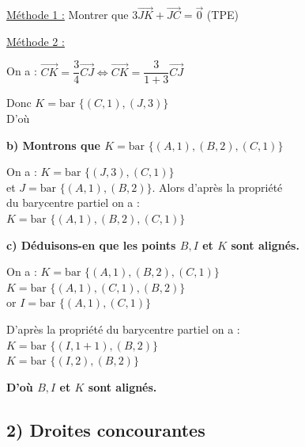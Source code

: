\documentclass{article}
\begin{document}
\noindent \underline{Méthode 1 :} Montrer que $3 \overrightarrow{JK} + \overrightarrow{JC} = \vec{0}$ (TPE)

\noindent \underline{Méthode 2 :}

\noindent On a : $\overrightarrow{CK} = \dfrac{3}{4} \overrightarrow{CJ} \iff \overrightarrow{CK} = \dfrac{3}{1 + 3} \overrightarrow{CJ}$

\vspace{1.5em}

\noindent Donc $K = \text{bar } \{(C, 1), (J, 3)\}$ \\
D'où 

\vspace{2em}

\noindent \textbf{b) Montrons que $K = \text{bar } \{(A, 1), (B, 2), (C, 1)\}$}

\noindent On a : $K = \text{bar } \{(J, 3), (C, 1)\}$ \\
\phantom{On a : } et $J = \text{bar } \{(A, 1), (B, 2)\}$. Alors d'après la propriété \\
du barycentre partiel on a : \\
$K = \text{bar } \{(A, 1), (B, 2), (C, 1)\}$

\vspace{2em}

\noindent \textbf{c) Déduisons-en que les points $B, I$ et $K$ sont alignés.}

\vspace{1em}

\noindent On a : $K = \text{bar } \{(A, 1), (B, 2), (C, 1)\}$ \\
\phantom{On a : } $K = \text{bar } \{(A, 1), (C, 1), (B, 2)\}$ \\
\phantom{On a : } or $I = \text{bar } \{(A, 1), (C, 1)\}$

\vspace{1em}

\noindent D'après la propriété du barycentre partiel on a : \\
$K = \text{bar } \{(I, 1 + 1), (B, 2)\}$ \\
$K = \text{bar } \{(I, 2), (B, 2)\}$

\vspace{1.5em}

\noindent \textbf{D'où $B, I$ et $K$ sont alignés.}

\subsection*{2) Droites concourantes}
\end{document}
